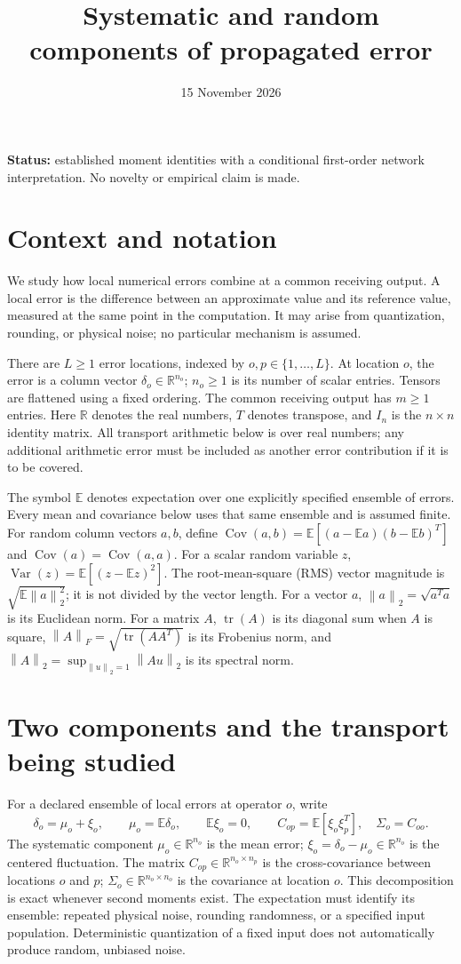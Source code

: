\documentclass[10pt,a4paper]{article}
\title{Systematic and random components of propagated error}
\author{}
\date{15 November 2026}
\newcommand{\R}{\mathbb{R}}
\newcommand{\E}{\mathbb{E}}
\newcommand{\norm}[1]{\left\lVert#1\right\rVert}
\DeclareMathOperator{\tr}{tr}
\DeclareMathOperator{\Cov}{Cov}
\begin{document}
\maketitle
\noindent\textbf{Status:} established moment identities with a conditional
first-order network interpretation. No novelty or empirical claim is made.

\section{Context and notation}
We study how local numerical errors combine at a common receiving output.
A local error is the difference between an approximate value and its reference
value, measured at the same point in the computation. It may arise from
quantization, rounding, or physical noise; no particular mechanism is assumed.

There are $L\geq1$ error locations, indexed by $o,p\in\{1,\ldots,L\}$.
At location $o$, the error is a column vector $\delta_o\in\R^{n_o}$;
$n_o\geq1$ is its number of scalar entries. Tensors are flattened using a fixed
ordering. The common receiving output has $m\geq1$ entries.
Here $\R$ denotes the real numbers, $T$ denotes transpose, and $I_n$ is the
$n\times n$ identity matrix. All transport arithmetic below is over real
numbers; any additional arithmetic error must be included as another error
contribution if it is to be covered.

The symbol $\E$ denotes expectation over one explicitly specified ensemble
of errors. Every mean and covariance below uses that same ensemble and is
assumed finite. For random column vectors $a,b$, define
$\Cov(a,b)=\E[(a-\E a)(b-\E b)^T]$ and $\Cov(a)=\Cov(a,a)$.
For a scalar random variable $z$, $\operatorname{Var}(z)=\E[(z-\E z)^2]$.
The root-mean-square (RMS) vector magnitude is $\sqrt{\E\norm{a}_2^2}$;
it is not divided by the vector length. For a vector $a$,
$\norm{a}_2=\sqrt{a^Ta}$ is its Euclidean norm. For a matrix $A$,
$\tr(A)$ is its diagonal sum when $A$ is square,
$\norm{A}_F=\sqrt{\tr(AA^T)}$ is its Frobenius norm, and
$\norm{A}_2=\sup_{\norm{u}_2=1}\norm{Au}_2$ is its spectral norm.

\section{Two components and the transport being studied}
For a declared ensemble of local errors at operator $o$, write
\begin{equation}
 \delta_o=\mu_o+\xi_o,\qquad
 \mu_o=\E\delta_o,\qquad \E\xi_o=0,\qquad
 C_{op}=\E[\xi_o\xi_p^T],\quad\Sigma_o=C_{oo}.
 \label{sr:decomposition}
\end{equation}
The systematic component $\mu_o\in\R^{n_o}$ is the mean error;
$\xi_o=\delta_o-\mu_o\in\R^{n_o}$ is the centered fluctuation.
The matrix $C_{op}\in\R^{n_o\times n_p}$ is the cross-covariance between
locations $o$ and $p$; $\Sigma_o\in\R^{n_o\times n_o}$ is the covariance
at location $o$. This decomposition is exact whenever second moments exist.
The expectation must identify its ensemble: repeated physical noise, rounding
randomness, or a specified input population. Deterministic quantization of a
fixed input does not automatically produce random, unbiased noise.
\end{document}
